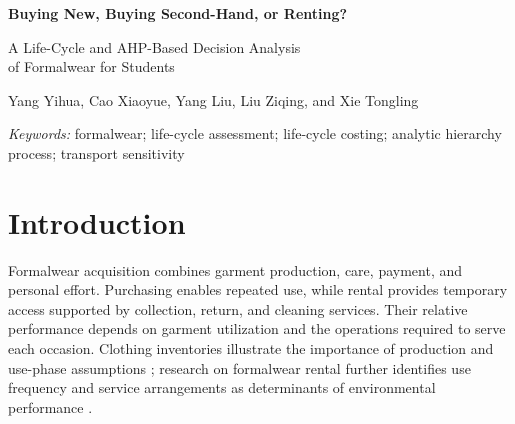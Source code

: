 \documentclass[11pt,a4paper]{article}
\begin{document}
\thispagestyle{plain}
\begin{center}
{\LARGE\bfseries Buying New, Buying Second-Hand, or Renting?\par}
\vspace{5pt}
{\Large A Life-Cycle and AHP-Based Decision Analysis\\of Formalwear for Students\par}
\vspace{10pt}
{\normalsize Yang Yihua, Cao Xiaoyue, Yang Liu, Liu Ziqing, and Xie Tongling\par}
\end{center}
\begin{abstract}
Students choosing whether to purchase or rent formalwear must balance carbon emissions, expenditure, and convenience. This study compares purchasing a new dress, purchasing a second-hand dress, and renting the same dress model for a National University of Singapore student attending six formal events over one year. Life cycle assessment (LCA) estimates allocated annual greenhouse gas emissions, while life cycle costing (LCC) quantifies direct consumer expenditure. These outcomes and a time-based convenience indicator are combined through analytic hierarchy process (AHP)-weighted composite scoring. Under baseline assumptions, annual emissions are 4.92 kg CO$_2$e for each purchase option and 11.38 kg CO$_2$e for rental. Annual expenditure is SGD 60.99, 72.00, and 108.00 for second-hand purchasing, new purchasing, and rental, respectively. Second-hand purchasing ranks first, reflecting its lower cost and identical modelled emissions and active time relative to new purchasing. Given rental's substantial collection-and-return burden, transport sensitivity analysis tests how travel attribution affects the ranking. The results support second-hand purchasing in the baseline scenario and identify substantial reductions in attributed travel burdens as a condition for rental competitiveness.
\end{abstract}
\noindent\textit{Keywords:} formalwear; life-cycle assessment; life-cycle costing; analytic hierarchy process; transport sensitivity

\section{Introduction}
Formalwear acquisition combines garment production, care, payment, and personal effort. Purchasing enables repeated use, while rental provides temporary access supported by collection, return, and cleaning services. Their relative performance depends on garment utilization and the operations required to serve each occasion. Clothing inventories illustrate the importance of production and use-phase assumptions \citep{sandin2019}; research on formalwear rental further identifies use frequency and service arrangements as determinants of environmental performance \citep{monticelli2023}.
\end{document}
